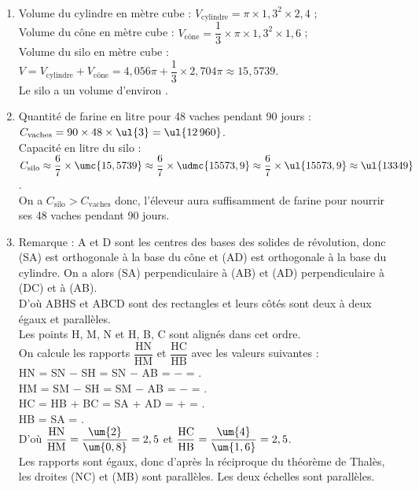 \ \\ [-5mm]
   \begin{enumerate}
      \item Volume du cylindre en mètre cube : $V_{\text{cylindre}} = \pi\times1,3^2\times2,4$ ; \\ [1mm]
         Volume du cône en mètre cube : $V_{\text{cône}} = \dfrac13\times\pi\times1,3^2\times1,6$ ; \\
         Volume du silo en mètre cube : $V =V_{\text{cylindre}}+V_{\text{cône}} =4,056\pi+\dfrac13\times2,704\pi \approx 15,5739$. \\
         {\blue Le silo a un volume d'environ }.
      \item Quantité de farine en litre pour 48 vaches pendant 90 jours : $C_{\text{vaches}} =90\times48\times\ul{3} =\ul{12\,960}$. \\
         Capacité en litre du silo : $C_{\text{silo}} \approx\dfrac67\times\umc{15,5739} \approx\dfrac67\times\udmc{15573,9} \approx\dfrac67\times\ul{15573,9} \approx \ul{13349}$. \\
         On a $C_{\text{silo}}>C_{\text{vaches}}$ donc, {\blue l'éleveur aura suffisamment de farine pour nourrir ses 48 vaches pendant 90 jours}.
      \item Remarque : A et D  sont les centres des bases des solides de révolution, donc (SA) est orthogonale à la base du cône et (AD) est orthogonale à la base du cylindre. On a alors (SA) perpendiculaire à (AB) et (AD) perpendiculaire à (DC) et à (AB). \\
         D'où ABHS et ABCD sont des rectangles et leurs côtés sont deux à deux égaux et parallèles. \\
         Les points H, M, N et H, B, C sont alignés dans cet ordre. \\ [1mm]
         On calcule les rapports $\dfrac{\text{HN}}{\text{HM}}$ et $\dfrac{\text{HC}}{\text{HB}}$ avec les valeurs suivantes : \\ [1mm]
         HN = SN $-$ SH = SN $-$ AB =  $-$  = . \\
         HM = SM $-$ SH = SM $-$ AB =  $-$  = . \\
         HC = HB + BC = SA + AD =  +  = . \\
         HB = SA = . \\ [1mm]
         D'où $\dfrac{\text{HN}}{\text{HM}} =\dfrac{\um{2}}{\um{0,8}} =2,5$ et $\dfrac{\text{HC}}{\text{HB}} =\dfrac{\um{4}}{\um{1,6}} =2,5$. \\ [1mm]
         Les rapports sont égaux, donc d'après la réciproque du théorème de Thalès, les droites (NC) et (MB) sont parallèles. {\blue Les deux échelles sont parallèles}.
   \end{enumerate}
